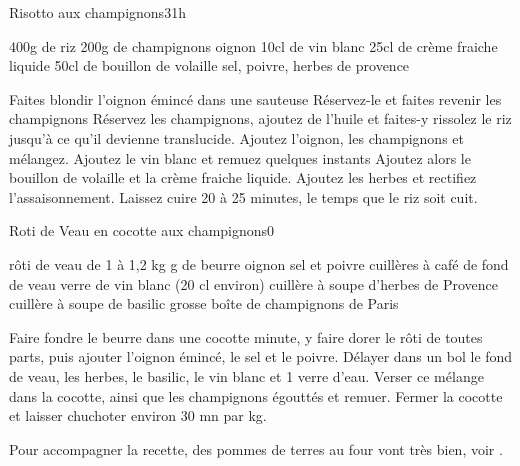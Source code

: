 \begin{recette}{Risotto aux champignons}{3}{1h}{}
\begin{ingredients}
\ingredient 400g de riz
\ingredient 200g de champignons
 oignon
\ingredient 10cl de vin blanc
\ingredient 25cl de crème fraiche liquide
\ingredient 50cl de bouillon de volaille
\ingredient sel, poivre, herbes de provence
\end{ingredients}

\begin{preparation}
\etape Faites blondir l'oignon émincé dans une sauteuse
\etape Réservez-le et faites revenir les champignons
\etape Réservez les champignons, ajoutez de l'huile et faites-y rissolez le riz jusqu'à ce qu'il devienne translucide.
\etape Ajoutez l'oignon, les champignons et mélangez.
\etape Ajoutez le vin blanc et remuez quelques instants 
\etape Ajoutez alors le bouillon de volaille et la crème fraiche liquide. 
\etape Ajoutez les herbes et rectifiez l'assaisonnement.
\etape Laissez cuire 20 à 25 minutes, le temps que le riz soit cuit. 
\end{preparation}

\end{recette}

\begin{recette}{Roti de Veau en cocotte aux champignons}{0}{}{}
\begin{ingredients}
 rôti de veau de 1 à 1,2 kg
 g de beurre
 oignon
\ingredient sel et poivre
 cuillères à café de fond de veau
 verre de vin blanc (20 cl environ)
 cuillère à soupe d'herbes de Provence
 cuillère à soupe de basilic
 grosse boîte de champignons de Paris
\end{ingredients}

\begin{preparation}
\etape Faire fondre le beurre dans une cocotte minute, y faire dorer le rôti de toutes parts, puis ajouter l'oignon émincé, le sel et le poivre.
\etape Délayer dans un bol le fond de veau, les herbes, le basilic, le vin blanc et 1 verre d'eau. Verser ce mélange dans la cocotte, ainsi que les champignons égouttés et remuer.
\etape Fermer la cocotte et laisser chuchoter environ 30 mn par kg.
\end{preparation}

\begin{remarque}
Pour accompagner la recette, des pommes de terres au four vont très bien, voir .
\end{remarque}
\end{recette}

